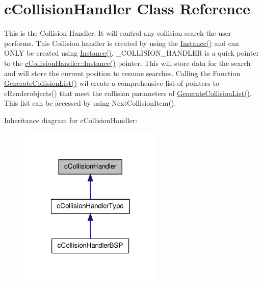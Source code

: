\hypertarget{classc_collision_handler}{
\section{cCollisionHandler Class Reference}
\label{classc_collision_handler}
}


This is the Collision Handler. It will control any collision search the user performs. This Collision handler is created by using the \hyperlink{classc_collision_handler_a1c4fee89d756b7c73dd877e732713f69}{Instance()} and can ONLY be created using \hyperlink{classc_collision_handler_a1c4fee89d756b7c73dd877e732713f69}{Instance()}. \_\-COLLISION\_\-HANDLER is a quick pointer to the \hyperlink{classc_collision_handler_a1c4fee89d756b7c73dd877e732713f69}{cCollisionHandler::Instance()} pointer. This will store data for the search and will store the current position to resume searches. Calling the Function \hyperlink{classc_collision_handler_aa52da10a253a2497db9b197c3f0c760d}{GenerateCollisionList()} wil create a comprehensive list of pointers to cRenderobjects() that meet the collision parameters of \hyperlink{classc_collision_handler_aa52da10a253a2497db9b197c3f0c760d}{GenerateCollisionList()}. This list can be accessed by using NextCollisionItem().  




Inheritance diagram for cCollisionHandler:
\nopagebreak
\begin{figure}[H]
\begin{center}
\leavevmode
\includegraphics[width=194pt]{classc_collision_handler__inherit__graph}
\end{center}
\end{figure}


